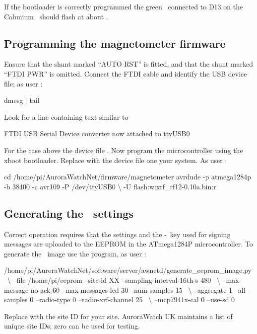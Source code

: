 If the bootloader is correctly programmed the green \led\ connected to
D13 on the Calunium \pcb\ should flash at about .

\subsection{Programming the magnetometer firmware}
Ensure that the shunt marked ``AUTO RST'' is fitted, and that the
shunt marked ``FTDI PWR'' is omitted. Connect the FTDI cable and
identify the USB device file; as user \piUser:
\begin{Cmd}
  dmesg | tail
\end{Cmd}

Look for a line containing text similar to
\begin{Cmd}
  FTDI USB Serial Device converter now attached to ttyUSB0
\end{Cmd}
For the case above the device file . Now
program the microcontroller using the xboot bootloader. Replace
 with the device file one your system. As user
\piUser:
\begin{Cmd}
  cd /home/pi/AuroraWatchNet/firmware/magnetometer
  avrdude -p atmega1284p -b 38400 -c avr109 -P /dev/ttyUSB0 \textbackslash
      -U flash:w:xrf_rf12-0.10a.bin:r
\end{Cmd}



\subsection[Generating the EEPROM settings]{Generating the \eeprom\
  settings}
\label{sec:generate-eeprom-settings}
Correct operation requires that the settings and the \hmac-\mdfive\
key used for signing messages are uploaded to the EEPROM in the
ATmega1284P microcontroller. To generate the \eeprom\ image use the
\filename{generate_eeprom_image} program, as user \piUser:
\begin{Cmd}[fontsize=\small]
/home/pi/AuroraWatchNet/software/server/awnetd/generate_eeprom_image.py \
\textbackslash
--file /home/pi/eeprom --site-id XX --sampling-interval-16th-s 480 \
\textbackslash
--max-message-no-ack 60 --max-messages-led 30 --num-samples 15 \
\textbackslash
--aggregate 1 --all-samples 0 --radio-type 0 --radio-xrf-channel 25 \
\textbackslash
--mcp7941x-cal 0 --use-sd 0
\end{Cmd}
Replace \filename{XX} with the site ID for your site. AuroraWatch UK
maintains a list of unique site IDs; zero can be used for testing.

